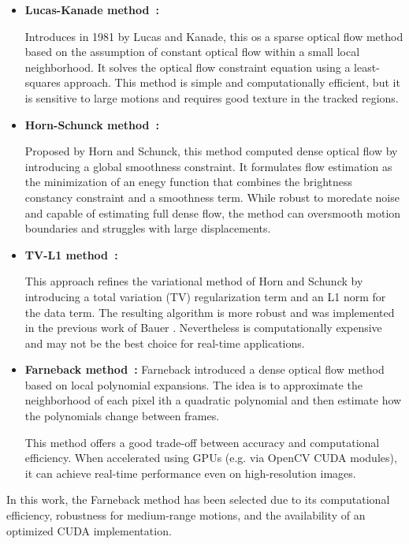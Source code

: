 \begin{itemize}
  \item \textbf{Lucas-Kanade method~\cite{flow_lucas_kanade}:}
  
  Introduces in 1981 by Lucas and Kanade, this os a sparse optical flow method based on the assumption
  of constant optical flow within a small local neighborhood. It solves the optical flow constraint
  equation using a least-squares approach. This method is simple and computationally efficient, but it is 
  sensitive to large motions and requires good texture in the tracked regions.

  \item \textbf{Horn-Schunck method~\cite{opt_flw_schunck}:}
  
  Proposed by Horn and Schunck, this method computed dense optical flow by introducing a global smoothness
  constraint. It formulates flow estimation as the minimization of an enegy function that combines the 
  brightness constancy constraint and a smoothness term. While robust to moredate noise and capable of estimating
  full dense flow, the method can oversmooth motion boundaries and struggles with large displacements.

  \item \textbf{TV-L1 method~\cite{opt_flw_tv_l1}:} 
  
  This approach refines the variational method of Horn and Schunck by introducing a total variation (TV) 
  regularization term and an L1 norm for the data term. The resulting algorithm is more robust and was 
  implemented in the previous work of Bauer \cite{previous_tfm_bauer}. Nevertheless is computationally
  expensive and may not be the best choice for real-time applications.

  \item \textbf{Farneback method~\cite{opf_flw_farneback}:}
  Farneback introduced a dense optical flow method based on local polynomial expansions. The idea is to 
  approximate the neighborhood of each pixel ith a quadratic polynomial and then estimate how the polynomials
  change between frames. 

  This method offers a good trade-off between accuracy and computational efficiency. When accelerated using
  GPUs (e.g. via OpenCV CUDA modules), it can achieve real-time performance even on high-resolution images.
\end{itemize}

In this work, the Farneback method has been selected due to its computational efficiency, robustness for medium-range motions,
and the availability of an optimized CUDA implementation.

